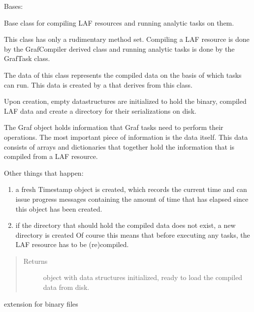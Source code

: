 \documentclass[letterpaper,10pt,english]{sphinxmanual}
\begin{document}
\begin{fulllineitems}
\label{graf/graf:graf.graf.Graf}
Bases: 

Base class for compiling LAF resources and running analytic tasks on them.

This class has only a rudimentary method set. Compiling a LAF resource is done by the GrafCompiler derived class
and running analytic tasks is done by the GrafTask class.

The data of this class represents the compiled data on the basis of which tasks can run.
This data is created by a {\hyperref[graf/graf:graf.compiler.GrafCompiler]{}} that derives from this class.

Upon creation, empty datastructures are initialized to hold the binary,
compiled LAF data and create a directory for their serializations on disk.

The Graf object holds information that Graf tasks need to perform their operations.
The most important piece of information is the data itself.
This data consists of arrays and dictionaries that together hold the information that is compiled from a LAF resource.

Other things that happen:
\begin{enumerate}
\item {} 
a fresh Timestamp object is created, which records the current time and can issue progress messages containing the amount
of time that has elapsed since this object has been created.

\item {} 
if the directory that should hold the compiled data does not exist,
a new directory is created Of course this means that before executing any tasks,
the LAF resource has to be (re)compiled.

\end{enumerate}
\begin{quote}\begin{description}
\item[{Returns}] \leavevmode
object with data structures initialized, ready to load the compiled data from disk.

\end{description}\end{quote}

\begin{fulllineitems}
\label{graf/graf:graf.graf.Graf.BIN_EXT}
extension for binary files


\end{fulllineitems}
\end{fulllineitems}
\end{document}
